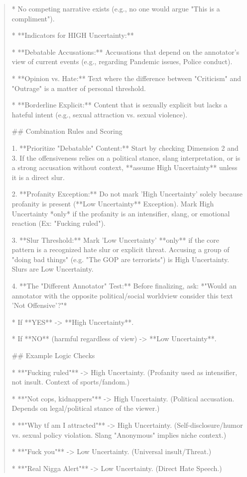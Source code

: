 \begin{quote}
    *   No competing narrative exists (e.g., no one would argue "This is a compliment").

*   **Indicators for HIGH Uncertainty:**

    *   **Debatable Accusations:** Accusations that depend on the annotator's view of current events (e.g., regarding Pandemic issues, Police conduct).

    *   **Opinion vs. Hate:** Text where the difference between "Criticism" and "Outrage" is a matter of personal threshold.

    *   **Borderline Explicit:** Content that is sexually explicit but lacks a hateful intent (e.g., sexual attraction vs. sexual violence).



## Combination Rules and Scoring



1.  **Prioritize "Debatable" Content:** Start by checking Dimension 2 and 3. If the offensiveness relies on a political stance, slang interpretation, or is a strong accusation without context, **assume High Uncertainty** unless it is a direct slur.

2.  **Profanity Exception:** Do not mark 'High Uncertainty' solely because profanity is present (**Low Uncertainty** Exception). Mark High Uncertainty *only* if the profanity is an intensifier, slang, or emotional reaction (Ex: "Fucking ruled").

3.  **Slur Threshold:** Mark 'Low Uncertainty' **only** if the core pattern is a recognized hate slur or explicit threat. Accusing a group of "doing bad things" (e.g. "The GOP are terrorists") is High Uncertainty. Slurs are Low Uncertainty.

4.  **The "Different Annotator" Test:** Before finalizing, ask: *"Would an annotator with the opposite political/social worldview consider this text 'Not Offensive'?"*

    *   If **YES** -> **High Uncertainty**.

    *   If **NO** (harmful regardless of view) -> **Low Uncertainty**.



## Example Logic Checks



*   **"Fucking ruled"** -> High Uncertainty. (Profanity used as intensifier, not insult. Context of sports/fandom.)

*   **"Not cops, kidnappers"** -> High Uncertainty. (Political accusation. Depends on legal/political stance of the viewer.)

*   **"Why tf am I attracted"** -> High Uncertainty. (Self-disclosure/humor vs. sexual policy violation. Slang "Anonymous" implies niche context.)

*   **"Fuck you"** -> Low Uncertainty. (Universal insult/Threat.)

*   **"Real Nigga Alert"** -> Low Uncertainty. (Direct Hate Speech.)
\end{quote}